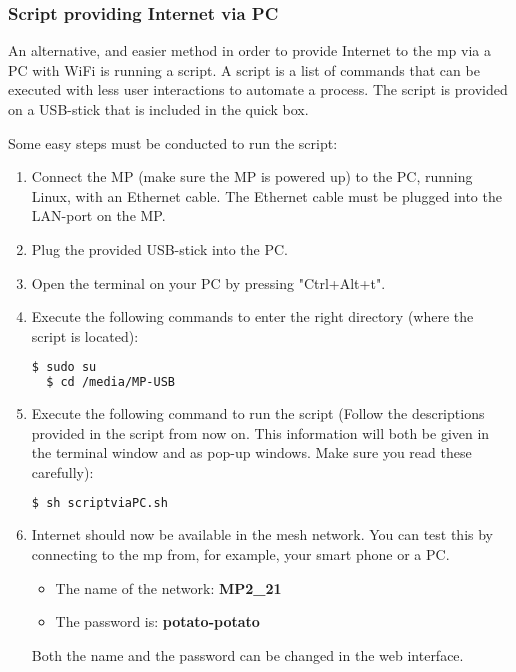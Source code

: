 \subsubsection{Script providing Internet via PC}

An alternative, and easier method in order to provide Internet to the \gls{mp} via a PC with WiFi is running a script. A script is a list of commands that can be executed with less user interactions to automate a process. The script is provided on a USB-stick that is included in the \gls{quick} box. 

Some easy steps must be conducted to run the script:
\begin{enumerate}
\item Connect the MP (make sure the MP is powered up) to the PC, running Linux, with an Ethernet cable. The Ethernet cable must be plugged into the LAN-port on the MP.
\item Plug the provided USB-stick into the PC.  
\item Open the terminal on your PC by pressing "Ctrl+Alt+t". 
\item Execute the following commands to enter the right directory (where the script is located):
\noindent
\begin{lstlisting}[language=bash]
  $ sudo su
  $ cd /media/MP-USB
\end{lstlisting}
\item Execute the following command to run the script (Follow the descriptions provided in the script from now on. This information will both be given in the terminal window and as pop-up windows. Make sure you read these carefully):
\noindent
\begin{lstlisting}[language=bash]
  $ sh scriptviaPC.sh
\end{lstlisting}
\item Internet should now be available in the mesh network. You can test this by connecting to the \gls{mp} from, for example, your smart phone or a PC. 
\begin{itemize}
\item The name of the network: \textbf{MP2_21}
\item The password is: \textbf{potato-potato}
\end{itemize}
Both the name and the password can be changed in the web interface. 
\end{enumerate}